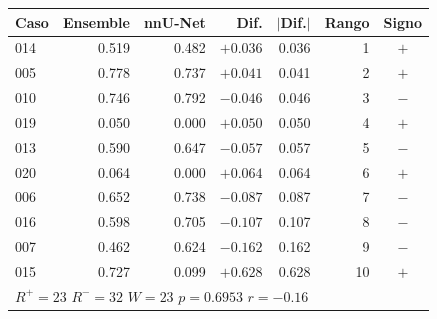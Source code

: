 \begin{tabular}{lrrrrrc}
\toprule
Caso & Ensemble & nnU-Net & Dif. & $|$Dif.$|$ & Rango & Signo \\
\midrule
014 & 0.519 & 0.482 & $+0.036$ & 0.036 & 1 & $+$ \\
005 & 0.778 & 0.737 & $+0.041$ & 0.041 & 2 & $+$ \\
010 & 0.746 & 0.792 & $-0.046$ & 0.046 & 3 & $-$ \\
019 & 0.050 & 0.000 & $+0.050$ & 0.050 & 4 & $+$ \\
013 & 0.590 & 0.647 & $-0.057$ & 0.057 & 5 & $-$ \\
020 & 0.064 & 0.000 & $+0.064$ & 0.064 & 6 & $+$ \\
006 & 0.652 & 0.738 & $-0.087$ & 0.087 & 7 & $-$ \\
016 & 0.598 & 0.705 & $-0.107$ & 0.107 & 8 & $-$ \\
007 & 0.462 & 0.624 & $-0.162$ & 0.162 & 9 & $-$ \\
015 & 0.727 & 0.099 & $+0.628$ & 0.628 & 10 & $+$ \\
\midrule
\multicolumn{7}{l}{$R^+ = 23$ \quad $R^- = 32$ \quad $W = 23$ \quad $p = 0.6953$ \quad $r = -0.16$} \\
\bottomrule
\end{tabular}%